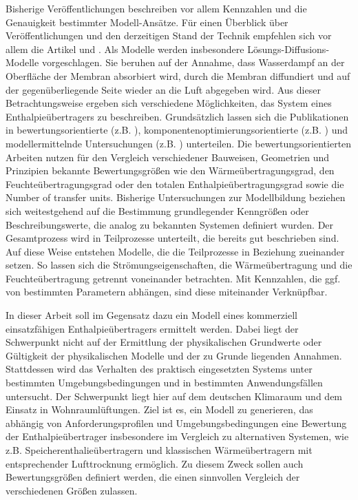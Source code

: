 Bisherige Veröffentlichungen beschreiben vor allem Kennzahlen und die Genauigkeit bestimmter Modell-Ansätze. Für einen Überblick über Veröffentlichungen und den derzeitigen Stand der Technik empfehlen sich vor allem die Artikel \cite{Zhang.2012} und \cite{JasonWoods.2014}.
Als Modelle werden insbesondere Lösungs-Diffusions-Modelle vorgeschlagen. Sie beruhen auf der Annahme, dass Wasserdampf an der Oberfläche der Membran absorbiert wird, durch die Membran diffundiert und auf der gegenüberliegende Seite wieder an die Luft abgegeben wird. Aus dieser Betrachtungsweise ergeben sich verschiedene Möglichkeiten, das System eines Enthalpieübertragers zu beschreiben. 
Grundsätzlich lassen sich die Publikationen in bewertungsorientierte (z.B. \cite{Nasif.2010}), komponentenoptimierungsorientierte (z.B. \cite{Chen.1997}) und modellermittelnde Untersuchungen (z.B. \cite{Zhang.2010}) unterteilen. 
Die bewertungsorientierten Arbeiten nutzen für den Vergleich verschiedener Bauweisen, Geometrien und Prinzipien bekannte Bewertungsgrößen wie den Wärmeübertragungsgrad, den Feuchteübertragungsgrad oder den totalen Enthalpieübertragungsgrad sowie die Number of transfer units.
Bisherige Untersuchungen zur Modellbildung beziehen sich weitestgehend auf die Bestimmung grundlegender Kenngrößen oder Beschreibungswerte, die analog zu bekannten Systemen definiert wurden. Der Gesamtprozess wird in Teilprozesse unterteilt, die bereits gut beschrieben sind. Auf diese Weise entstehen Modelle, die die Teilprozesse in Beziehung zueinander setzen. So lassen sich  die Strömungseigenschaften, die Wärmeübertragung und die Feuchteübertragung getrennt voneinander betrachten. Mit Kennzahlen, die ggf. von bestimmten Parametern abhängen, sind diese miteinander Verknüpfbar. 

In dieser Arbeit soll im Gegensatz dazu ein Modell eines kommerziell einsatzfähigen Enthalpieübertragers ermittelt werden. Dabei liegt der Schwerpunkt nicht auf der Ermittlung der physikalischen Grundwerte oder Gültigkeit der physikalischen Modelle  und der zu Grunde liegenden Annahmen. Stattdessen wird das Verhalten des praktisch eingesetzten Systems unter bestimmten Umgebungsbedingungen und in bestimmten Anwendungsfällen untersucht. Der Schwerpunkt liegt hier auf dem deutschen Klimaraum und dem Einsatz in Wohnraumlüftungen. 
Ziel ist es, ein Modell zu generieren, das abhängig von Anforderungsprofilen und Umgebungsbedingungen eine Bewertung der Enthalpieübertrager insbesondere im Vergleich zu alternativen Systemen, wie z.B. Speicherenthalieübertragern und klassischen Wärmeübertragern mit entsprechender Lufttrocknung ermöglich. Zu diesem Zweck sollen auch Bewertungsgrößen definiert werden, die einen sinnvollen Vergleich der verschiedenen Größen zulassen. 


